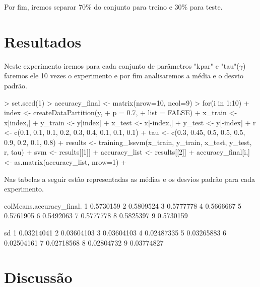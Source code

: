 \documentclass[12pt]{article}
\begin{document}
 \par Por fim, iremos separar 70\%  do conjunto para treino e 30\% para teste. 


\section{Resultados}
  
  \par Neste experimento iremos para cada conjunto de parâmetros "kpar" e "tau"($\gamma$) faremos ele 10 vezes o experimento e por fim analisaremos a média e o desvio padrão.
  
\begin{Schunk}
\begin{Sinput}
> set.seed(1)
> accuracy_final <- matrix(nrow=10, ncol=9)
> for(i in 1:10){
+   index <- createDataPartition(y,
+                                p = 0.7, 
+                                list = FALSE)
+   x_train <- x[index,]
+   y_train <- y[index]
+   x_test <- x[-index,]
+   y_test <- y[-index]
+   r <- c(0.1, 0.1, 0.1, 0.2, 0.3, 0.4, 0.1, 0.1, 0.1)
+   tau <- c(0.3, 0.45, 0.5, 0.5, 0.5, 0.9, 0.2, 0.1, 0.8)
+   results <- training_lssvm(x_train, y_train, x_test, y_test, r, tau)
+   svm <- results[[1]]
+   accuracy_list <- results[[2]]
+   accuracy_final[i,] <- as.matrix(accuracy_list, nrow=1)
+ }
\end{Sinput}
\end{Schunk}

  \par Nas tabelas a seguir estão representadas as médias e os desvios padrão para cada experimento.
\begin{Schunk}
\begin{Soutput}
  colMeans.accuracy_final.
1                0.5730159
2                0.5809524
3                0.5777778
4                0.5666667
5                0.5761905
6                0.5492063
7                0.5777778
8                0.5825397
9                0.5730159
\end{Soutput}
\begin{Soutput}
          sd
1 0.03214041
2 0.03604103
3 0.03604103
4 0.02487335
5 0.03265883
6 0.02504161
7 0.02718568
8 0.02804732
9 0.03774827
\end{Soutput}
\end{Schunk}


\section{Discussão}
\end{document}
